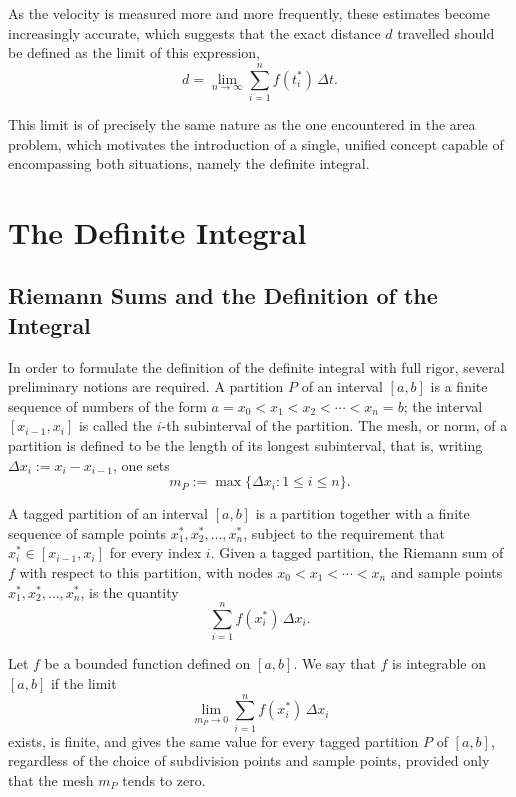 As the velocity is measured more and more frequently, these estimates become increasingly accurate, which suggests that the exact distance $d$ travelled should be defined as the limit of this expression,
\[
d = \lim_{n \to \infty} \sum_{i=1}^{n} f(t_i^*) \, \Delta t.
\]

This limit is of precisely the same nature as the one encountered in the area problem, which motivates the introduction of a single, unified concept capable of encompassing both situations, namely the definite integral.

\section{The Definite Integral}

\subsection{Riemann Sums and the Definition of the Integral}


In order to formulate the definition of the definite integral with full rigor, several preliminary notions are required. A partition $P$ of an interval $[a,b]$ is a finite sequence of numbers of the form $a = x_0 < x_1 < x_2 < \cdots < x_n = b$; the interval $[x_{i-1}, x_i]$ is called the $i$-th subinterval of the partition. The mesh, or norm, of a partition is defined to be the length of its longest subinterval, that is, writing $\Delta x_i := x_i - x_{i-1}$, one sets
\[
m_P := \max\{ \Delta x_i : 1 \leq i \leq n \}.
\]

A tagged partition of an interval $[a,b]$ is a partition together with a finite sequence of sample points $x_1^*, x_2^*, \ldots, x_n^*$, subject to the requirement that $x_i^* \in [x_{i-1}, x_i]$ for every index $i$. Given a tagged partition, the Riemann sum of $f$ with respect to this partition, with nodes $x_0 < x_1 < \cdots < x_n$ and sample points $x_1^*, x_2^*, \ldots, x_n^*$, is the quantity
\[
\sum_{i=1}^{n} f(x_i^*) \, \Delta x_i.
\]

\begin{definition}
Let $f$ be a bounded function defined on $[a,b]$. We say that $f$ is integrable on $[a,b]$ if the limit \[
\lim_{m_P \to 0} \sum_{i=1}^{n} f(x_i^*) \, \Delta x_i
\] exists, is finite, and gives the same value for every tagged partition $P$ of $[a,b]$, regardless of the choice of subdivision points and sample points, provided only that the mesh $m_P$ tends to zero.
\end{definition}

